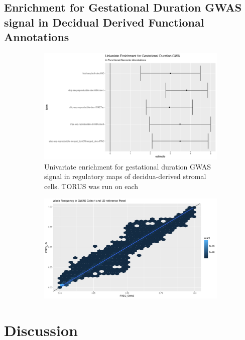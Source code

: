 \subsection{Enrichment for Gestational Duration GWAS signal in Decidual Derived Functional Annotations}

\begin{figure}
  \centering
  \begin{subfigure}[t]{\textwidth}
    \centering
    \includegraphics[width=\linewidth]{img/ptb_univ_assoc.png}
    \caption{Univariate enrichment for gestational duration GWAS signal in regulatory maps of decidua-derived stromal cells. TORUS was run on each }\label{fig:univ_assoc}
  \end{subfigure}
    \begin{subfigure}[t]{\textwidth}
    \centering
    \includegraphics[width=\linewidth]{img/Allele_freq_match.png}
    \caption{}\label{fig:multiv_assoc}
    \end{subfigure}
\end{figure}



\section{Discussion}\label{sec:org53f1196}

